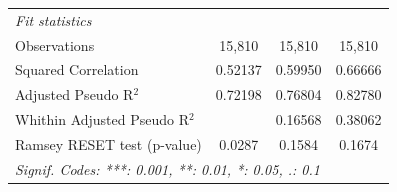 \begin{tabular}{lccc}
   \midrule
   \emph{Fit statistics}\\
   Observations                  & 15,810  & 15,810          & 15,810\\  
   Squared Correlation           & 0.52137 & 0.59950         & 0.66666\\  
   Adjusted Pseudo R$^2$         & 0.72198 & 0.76804         & 0.82780\\  
   Whithin Adjusted Pseudo R$^2$ &         & 0.16568         & 0.38062\\  
   Ramsey RESET test (p-value)   & 0.0287  & 0.1584          & 0.1674\\  
   \midrule \midrule
   \multicolumn{4}{l}{\emph{Signif. Codes: ***: 0.001, **: 0.01, *: 0.05, .: 0.1}}\\
\end{tabular}
\par\endgroup



